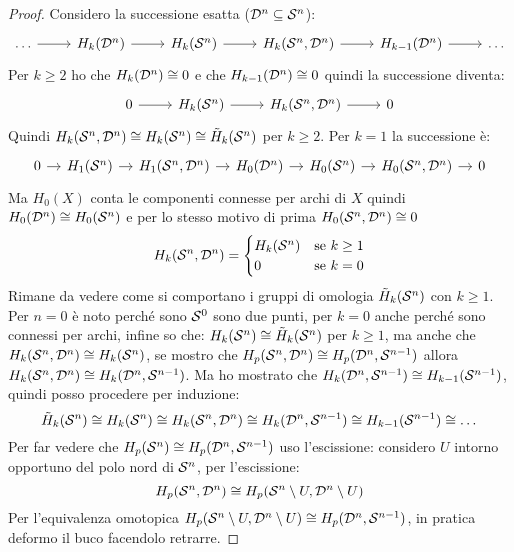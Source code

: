 \begin{proof}
  Considero la successione esatta ($ \mathcal{D}^{n} \subseteq \mathcal{S}^{n} $):
  \[
    \begin{tikzcd}
      \dots \rar & H_k(\Disk{n}) \rar & H_k(\Sph{n}) \rar & H_k(\Sph{n}, \Disk{n}) \rar & H_{k-1}(\Disk{n}) \rar & \dots
    \end{tikzcd}
  \]
  Per $ k \geq 2 $ ho che $ H_k(\mathcal{D}^{n}) \cong 0 $ e che $ H_{k-1}(\mathcal{D}^{n}) \cong 0 $ quindi
  la successione diventa:
  \[
    \begin{tikzcd}
      0 \rar & H_k(\Sph{n}) \rar & H_k(\Sph{n}, \Disk{n}) \rar & 0
    \end{tikzcd}
  \]
  Quindi $ H_k(\mathcal{S}^{n}, \mathcal{D}^{n}) \cong H_k(\mathcal{S}^{n}) \cong \tilde{H}_k(\mathcal{S}^{n}) $ per $ k \geq 2 $.
  Per $ k = 1 $ la successione è:
  \[
    \begin{tikzcd}[nodes={column sep=10pt}]
      0 \rar & H_1(\Sph{n}) \rar & H_1(\Sph{n}, \Disk{n}) \rar & H_0(\Disk{n}) \rar & H_0(\Sph{n}) \rar & H_0(\Sph{n}, \Disk{n}) \rar & 0
    \end{tikzcd}
  \]
  Ma $ H_0(X) $ conta le componenti connesse per archi di $ X $ quindi $ H_0(\mathcal{D}^{n}) \cong H_0(\mathcal{S}^{n}) $
  e per lo stesso motivo di prima $ H_0(\mathcal{S}^{n}, \mathcal{D}^{n}) \cong 0$
  \[
    H_k(\mathcal{S}^{n}, \mathcal{D}^{n}) =
    \begin{cases}
      H_k(\mathcal{S}^{n}) & \text{se } k \geq 1 \\
      0 & \text{se } k = 0
    \end{cases}
  \]
  Rimane da vedere come si comportano i gruppi di omologia $ \tilde{H}_k(\mathcal{S}^{n}) $ con $ k \geq 1 $.
  Per $ n = 0 $ è noto perché sono $ \mathcal{S}^{0} $ sono due punti, per $ k = 0 $ anche perché sono connessi
  per archi, infine so che: $ H_k(\mathcal{S}^{n}) \cong \tilde{H}_k(\mathcal{S}^{n}) $ per $ k \geq 1 $, ma anche
  che $ H_k(\mathcal{S}^{n}, \mathcal{D}^{n}) \cong H_k(\mathcal{S}^{n}) $, se mostro che $ H_p(\mathcal{S}^{n}, \mathcal{D}^{n}) \cong H_p(\mathcal{D}^{n}, \mathcal{S}^{n-1}) $
  allora $ H_k(\mathcal{S}^{n}, \mathcal{D}^{n}) \cong H_k(\mathcal{D}^{n}, \mathcal{S}^{n-1}) $.
  Ma ho mostrato che $ H_k(\mathcal{D}^{n}, \mathcal{S}^{n-1}) \cong H_{k-1}(\mathcal{S}^{n-1}) $, quindi posso procedere
  per induzione:
  \[
    \tilde{H}_k(\mathcal{S}^{n}) \cong H_k(\mathcal{S}^{n}) \cong H_k(\mathcal{S}^{n}, \mathcal{D}^{n}) \cong H_k(\mathcal{D}^{n}, \mathcal{S}^{n-1}) \cong H_{k-1}(\mathcal{S}^{n-1}) \cong \dots
  \]
  Per far vedere che $ H_p(\mathcal{S}^{n}) \cong H_p(\mathcal{D}^{n}, \mathcal{S}^{n-1}) $ uso l'escissione:
  considero $ U $ intorno opportuno del polo nord di $ \mathcal{S}^{n} $, per l'escissione:
  \[
    H_p(\mathcal{S}^{n}, \mathcal{D}^{n}) \cong H_p(\mathcal{S}^{n} \setminus U, \mathcal{D}^{n} \setminus U )
  \]
  Per l'equivalenza omotopica $  H_p(\mathcal{S}^{n} \setminus U, \mathcal{D}^{n} \setminus U ) \cong H_p(\mathcal{D}^{n}, \mathcal{S}^{n-1}) $, in pratica
  deformo il buco facendolo retrarre.



\end{proof}
